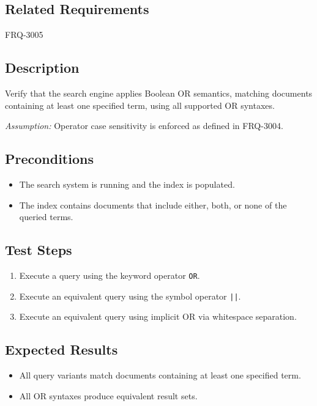 \documentclass{article}
\begin{document}
\subsection*{Related Requirements}
FRQ-3005

\subsection*{Description}
Verify that the search engine applies Boolean OR semantics, matching documents containing at least one specified term, using all supported OR syntaxes.

\textit{Assumption:} Operator case sensitivity is enforced as defined in FRQ-3004.

\subsection*{Preconditions}
\begin{itemize}
    \item The search system is running and the index is populated.
    \item The index contains documents that include either, both, or none of the queried terms.
\end{itemize}

\subsection*{Test Steps}
\begin{enumerate}
    \item Execute a query using the keyword operator \texttt{OR}.
    \item Execute an equivalent query using the symbol operator \texttt{||}.
    \item Execute an equivalent query using implicit OR via whitespace separation.
\end{enumerate}

\subsection*{Expected Results}
\begin{itemize}
    \item All query variants match documents containing at least one specified term.
    \item All OR syntaxes produce equivalent result sets.
\end{itemize}

\end{document}
